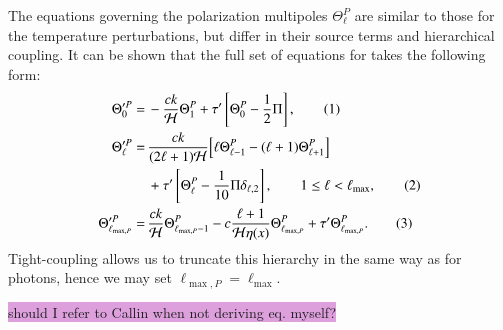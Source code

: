 \documentclass{aa}
\newcommand\numberthis{\addtocounter{equation}{1}\tag{\theequation}}
\numberwithin{equation}{section}
\numberwithin{table}{section}
\numberwithin{figure}{section}
\begin{document}
The equations governing the polarization multipoles $\Theta^P_\ell$ are similar to those for the temperature perturbations, but differ in their source terms and hierarchical coupling. It can be shown that the full set of equations for takes the following form:
\begin{align*} 
  \Theta'^P_0 =\, &-\frac{ck}{\mathcal{H}} \Theta^P_1 + \tau' \left[ \Theta^P_{0} - \frac{1}{2} \Pi \right], \numberthis \\ 
  \Theta'^P_{\ell} =\, &\frac{ck}{(2\ell+1)\mathcal{H}} \Big[\ell\Theta^P_{\ell-1} - (\ell+1)\Theta^P_{\ell+1}\Big] \\
  &+ \tau' \left[ \Theta^P_{\ell} - \frac{1}{10} \Pi \delta_{\ell,2} \right], \qquad 1 \leq \ell < \ell_{\max}, \numberthis \\ 
  \Theta'^P_{\ell_{\max,P}} =\, &\frac{ck}{\mathcal{H}} \Theta^P_{\ell_{\max,P}-1} - c \frac{\ell+1}{\mathcal{H}\eta(x)} \Theta^P_{\ell_{\max,P}} + \tau' \Theta^P_{\ell_{\max,P}}. \numberthis
\end{align*}
Tight-coupling allows us to truncate this hierarchy in the same way as for photons, hence we may set $\ell_{\max,P}=\ell_{\max}$.

\colorbox{Plum}{should I refer to Callin when not deriving eq. myself?}


\end{document}
